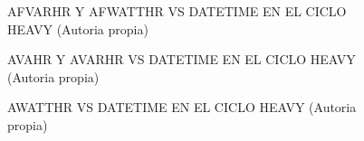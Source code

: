 \begin{figure}[H]
  \hfill
  \hfill
  \hfill
  \caption{AFVARHR Y AFWATTHR VS DATETIME EN EL CICLO HEAVY (Autoria propia)}
  \end{figure}
\begin{figure}[H]
  \hfill
  \hfill
  \hfill
  \caption{AVAHR Y AVARHR VS DATETIME EN EL CICLO HEAVY (Autoria propia)}
  \end{figure}
\begin{figure}[H]
  \hfill
  \hfill
  \caption{AWATTHR VS DATETIME EN EL CICLO HEAVY (Autoria propia)}
  \end{figure}
